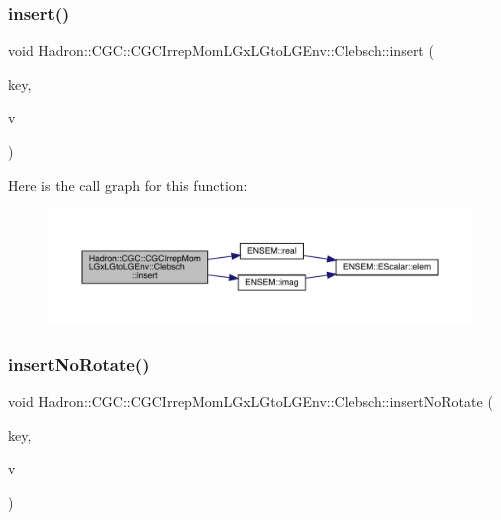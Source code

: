 \subsubsection{\texorpdfstring{insert()}{insert()}}
{\footnotesize\ttfamily void Hadron\+::\+C\+G\+C\+::\+C\+G\+C\+Irrep\+Mom\+L\+Gx\+L\+Gto\+L\+G\+Env\+::\+Clebsch\+::insert (\begin{DoxyParamCaption}\item[{const \mbox{\hyperlink{structHadron_1_1CGCKeyType}{C\+G\+C\+Key\+Type}}$<$ \mbox{\hyperlink{structHadron_1_1KeyCGCIrrepMom__t}{Key\+C\+G\+C\+Irrep\+Mom\+\_\+t}} $>$ \&}]{key,  }\item[{const \mbox{\hyperlink{namespaceHadron_1_1CGC_a52d2b70e6792726fb525eab94daae53b}{cdouble}} \&}]{v }\end{DoxyParamCaption})\hspace{0.3cm}{\ttfamily [inline]}}

Here is the call graph for this function\+:\nopagebreak
\begin{figure}[H]
\begin{center}
\leavevmode
\includegraphics[width=350pt]{d1/d39/classHadron_1_1CGC_1_1CGCIrrepMomLGxLGtoLGEnv_1_1Clebsch_a4d4ec2ede98509ab49ac04fe23ef2ea8_cgraph}
\end{center}
\end{figure}
\mbox{\label{classHadron_1_1CGC_1_1CGCIrrepMomLGxLGtoLGEnv_1_1Clebsch_a57c67efaf6fb826157a5c19a4066959e}} 
\subsubsection{\texorpdfstring{insertNoRotate()}{insertNoRotate()}}
{\footnotesize\ttfamily void Hadron\+::\+C\+G\+C\+::\+C\+G\+C\+Irrep\+Mom\+L\+Gx\+L\+Gto\+L\+G\+Env\+::\+Clebsch\+::insert\+No\+Rotate (\begin{DoxyParamCaption}\item[{const \mbox{\hyperlink{structHadron_1_1CGCKeyType}{C\+G\+C\+Key\+Type}}$<$ \mbox{\hyperlink{structHadron_1_1KeyCGCIrrepMom__t}{Key\+C\+G\+C\+Irrep\+Mom\+\_\+t}} $>$ \&}]{key,  }\item[{\mbox{\hyperlink{namespaceHadron_1_1CGC_a52d2b70e6792726fb525eab94daae53b}{cdouble}}}]{v }\end{DoxyParamCaption})\hspace{0.3cm}{\ttfamily [inline]}}


